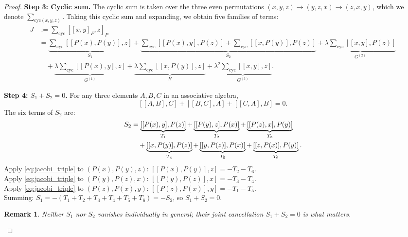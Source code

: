 \documentclass[10pt]{amsart}
\numberwithin{equation}{section}
\newtheorem{remark}[theorem]{Remark}
\begin{document}
\begin{proof}
\textbf{Step 3: Cyclic sum.}
The cyclic sum is taken over the three even permutations
$(x,y,z) \to (y,z,x) \to (z,x,y)$, which we denote $\sum_{\mathrm{cyc}(x,y,z)}$.
Taking this cyclic sum and expanding, we obtain five families of terms:
\begin{align*}
J &:= \sum_{\mathrm{cyc}}[[x,y]_P,z]_P \\
  &= \underbrace{\sum_{\mathrm{cyc}}[[P(x),P(y)],z]}_{S_1}
   + \underbrace{\sum_{\mathrm{cyc}}[[P(x),y],P(z)]
                +\sum_{\mathrm{cyc}}[[x,P(y)],P(z)]}_{S_2}
   + \underbrace{\lambda\sum_{\mathrm{cyc}}[[x,y],P(z)]}_{G^{(2)}}\\
  &\quad + \underbrace{\lambda\sum_{\mathrm{cyc}}[[P(x),y],z]}_{G^{(1)}}
   + \underbrace{\lambda\sum_{\mathrm{cyc}}[[x,P(y)],z]}_{H}
   + \underbrace{\lambda^2\sum_{\mathrm{cyc}}[[x,y],z]}_{G^{(3)}}.
\end{align*}

\textbf{Step 4: $S_1 + S_2 = 0$.}
For any three elements $A,B,C$ in an associative algebra,
\begin{equation}\label{eq:jacobi_triple}
[[A,B],C] + [[B,C],A] + [[C,A],B] = 0.
\end{equation}
The six terms of $S_2$ are:
\begin{align}\label{eq:group2}
S_2 &= \underbrace{[[P(x),y],P(z)]}_{T_1}
      + \underbrace{[[P(y),z],P(x)]}_{T_2}
      + \underbrace{[[P(z),x],P(y)]}_{T_3} \notag\\
    &\quad + \underbrace{[[x,P(y)],P(z)]}_{T_4}
      + \underbrace{[[y,P(z)],P(x)]}_{T_5}
      + \underbrace{[[z,P(x)],P(y)]}_{T_6}.
\end{align}
Apply \eqref{eq:jacobi_triple} to $(P(x),P(y),z)$:
$[[P(x),P(y)],z] = -T_2-T_6$.\\
Apply \eqref{eq:jacobi_triple} to $(P(y),P(z),x)$:
$[[P(y),P(z)],x] = -T_3-T_4$.\\
Apply \eqref{eq:jacobi_triple} to $(P(z),P(x),y)$:
$[[P(z),P(x)],y] = -T_1-T_5$.\\
Summing: $S_1 = -(T_1+T_2+T_3+T_4+T_5+T_6) = -S_2$, so $S_1+S_2 = 0$.

\begin{remark}\label{rem:S1S2}
Neither $S_1$ nor $S_2$ vanishes individually in general; their \emph{joint}
cancellation $S_1+S_2=0$ is what matters.
\end{remark}


\end{proof}
\end{document}
